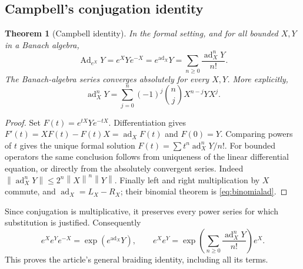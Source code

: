 \documentclass[11pt]{article}
\newtheorem{theorem}{Theorem}[section]
\theoremstyle{definition}
\theoremstyle{remark}
\newcommand{\ad}{\operatorname{ad}}
\newcommand{\Ad}{\operatorname{Ad}}
\newcommand{\norm}[1]{\left\lVert #1\right\rVert}
\numberwithin{equation}{section}
\begin{document}
\subsection{Campbell's conjugation identity}
\begin{theorem}[Campbell identity]\label{thm:campbell}
In the formal setting, and for all bounded $X,Y$ in a Banach algebra,
\begin{equation}\label{eq:campbell}
 \Ad_{e^X}Y=e^XYe^{-X}=e^{\ad_X}Y
          =\sum_{n\geq0}\frac{\ad_X^nY}{n!}.
\end{equation}
The Banach-algebra series converges absolutely for every $X,Y$. More explicitly,
\begin{equation}\label{eq:binomialad}
 \ad_X^nY=\sum_{j=0}^n(-1)^j\binom nj X^{n-j}YX^j.
\end{equation}
\end{theorem}
\begin{proof}
Set $F(t)=e^{tX}Ye^{-tX}$. Differentiation gives
$F'(t)=XF(t)-F(t)X=\ad_XF(t)$ and $F(0)=Y$. Comparing powers of $t$ gives the unique formal solution $F(t)=\sum t^n\ad_X^nY/n!$. For bounded operators the same conclusion follows from uniqueness of the linear differential equation, or directly from the absolutely convergent series. Indeed $\norm{\ad_X^nY}\leq2^n\norm X^n\norm Y$. Finally left and right multiplication by $X$ commute, and $\ad_X=L_X-R_X$; their binomial theorem is \eqref{eq:binomialad}.
\end{proof}
Since conjugation is multiplicative, it preserves every power series for which substitution is justified. Consequently
\begin{equation}\label{eq:braiding}
 e^Xe^Ye^{-X}=\exp(e^{\ad_X}Y),\qquad
 e^Xe^Y=\exp\left(\sum_{n\geq0}\frac{\ad_X^nY}{n!}\right)e^X.
\end{equation}
This proves the article's general braiding identity, including all its terms.
\end{document}

